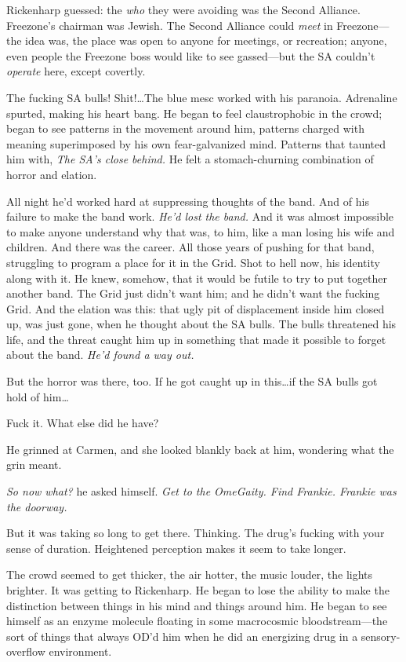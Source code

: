 Rickenharp guessed: the \textit{who} they were avoiding was the Second Alliance. Freezone's chairman was Jewish. The Second Alliance could \textit{meet} in Freezone---the idea was, the place was open to anyone for meetings, or recreation; anyone, even people the Freezone boss would like to see gassed---but the SA couldn't \textit{operate} here, except covertly.

The fucking SA bulls! Shit!\ldots The blue mesc worked with his paranoia. Adrenaline spurted, making his heart bang. He began to feel claustrophobic in the crowd; began to see patterns in the movement around him, patterns charged with meaning superimposed by his own fear-galvanized mind. Patterns that taunted him with, \textit{The SA's close behind.} He felt a stomach-churning combination of horror and elation.

All night he'd worked hard at suppressing thoughts of the band. And of his failure to make the band work. \textit{He'd lost the band.} And it was almost impossible to make anyone understand why that was, to him, like a man losing his wife and children. And there was the career. All those years of pushing for that band, struggling to program a place for it in the Grid. Shot to hell now, his identity along with it. He knew, somehow, that it would be futile to try to put together another band. The Grid just didn't want him; and he didn't want the fucking Grid. And the elation was this: that ugly pit of displacement inside him closed up, was just gone, when he thought about the SA bulls. The bulls threatened his life, and the threat caught him up in something that made it possible to forget about the band. \textit{He'd found a way out.}

But the horror was there, too. If he got caught up in this\ldots if the SA bulls got hold of him\ldots

Fuck it. What else did he have?

He grinned at Carmen, and she looked blankly back at him, wondering what the grin meant.

\textit{So now what?} he asked himself. \textit{Get to the OmeGaity. Find Frankie. Frankie was the doorway.}

But it was taking so long to get there. Thinking. The drug's fucking with your sense of duration. Heightened perception makes it seem to take longer.

The crowd seemed to get thicker, the air hotter, the music louder, the lights brighter. It was getting to Rickenharp. He began to lose the ability to make the distinction between things in his mind and things around him. He began to see himself as an enzyme molecule floating in some macrocosmic bloodstream---the sort of things that always OD'd him when he did an energizing drug in a sensory-overflow environment.

